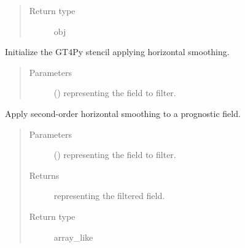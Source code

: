 \documentclass[letterpaper,10pt,english]{sphinxmanual}
\begin{document}
\begin{fulllineitems}
\begin{fulllineitems}
\begin{quote}
\begin{description}
\item[{Return type}] \leavevmode
obj

\end{description}\end{quote}

\end{fulllineitems}


\begin{fulllineitems}
\label{\detokenize{api:dycore.horizontal_smoothing.HorizontalSmoothingSecondOrderXYZ._stencil_initialize}}
Initialize the GT4Py stencil applying horizontal smoothing.
\begin{quote}\begin{description}
\item[{Parameters}] \leavevmode
{} () \textendash{}  representing the field to filter.

\end{description}\end{quote}

\end{fulllineitems}


\begin{fulllineitems}
\label{\detokenize{api:dycore.horizontal_smoothing.HorizontalSmoothingSecondOrderXYZ.apply}}
Apply second-order horizontal smoothing to a prognostic field.
\begin{quote}\begin{description}
\item[{Parameters}] \leavevmode
{} () \textendash{}  representing the field to filter.

\item[{Returns}] \leavevmode
{} representing the filtered field.

\item[{Return type}] \leavevmode
array\_like

\end{description}\end{quote}

\end{fulllineitems}


\end{fulllineitems}
\end{document}
